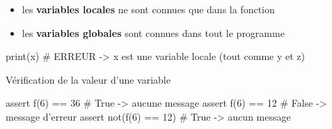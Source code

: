 \begin{remarque}
	
	\begin{itemize}
		\item les \textbf{variables locales} ne sont connues que dans la fonction
		\item les \textbf{variables globales} sont connues dans tout le programme
	\end{itemize}

\begin{CodePythontexAlt}[Centre,PremLigne=1, Lignes=false,]{}
print(x)   # ERREUR -> x est une variable locale (tout comme y et z)
\end{CodePythontexAlt}

\end{remarque}



\begin{easybox}{Vérification de la valeur d'une variable}{}

\begin{CodePythontexAlt}[Centre,PremLigne=1, Lignes=false,]{}
assert f(6) == 36     	# True -> aucune message 
assert f(6) == 12     	# False -> message d'erreur 
assert not(f(6) == 12)	# True -> aucun message

\end{CodePythontexAlt}
\end{easybox}

